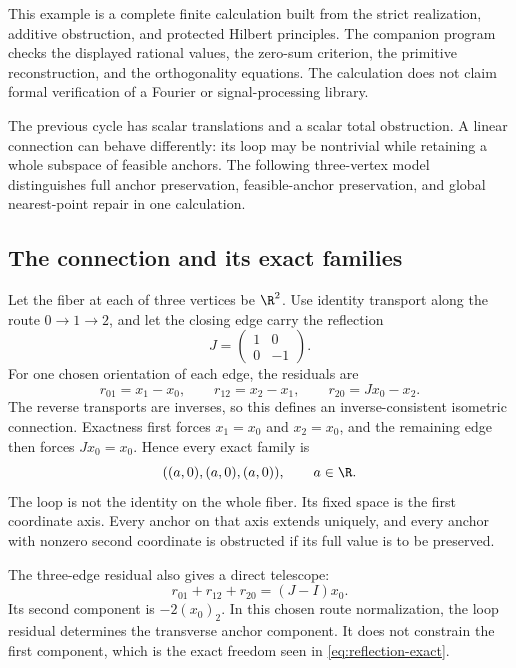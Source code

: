 This example is a complete finite calculation built from the strict realization, additive obstruction, and protected Hilbert principles. The companion program checks the displayed rational values, the zero-sum criterion, the primitive reconstruction, and the orthogonality equations. The calculation does not claim formal verification of a Fourier or signal-processing library.

\label{sec:twisted-loop}
The previous cycle has scalar translations and a scalar total obstruction. A linear connection can behave differently: its loop may be nontrivial while retaining a whole subspace of feasible anchors. The following three-vertex model distinguishes full anchor preservation, feasible-anchor preservation, and global nearest-point repair in one calculation.

\subsection{The connection and its exact families}
Let the fiber at each of three vertices be \(\R^2\). Use identity transport along the route \(0\to1\to2\), and let the closing edge carry the reflection
\[
 J=\begin{pmatrix}1&0\\0&-1\end{pmatrix}.
\]
For one chosen orientation of each edge, the residuals are
\[
 r_{01}=x_1-x_0,\qquad r_{12}=x_2-x_1,\qquad
 r_{20}=Jx_0-x_2.
\]
The reverse transports are inverses, so this defines an inverse-consistent isometric connection. Exactness first forces \(x_1=x_0\) and \(x_2=x_0\), and the remaining edge then forces \(Jx_0=x_0\). Hence every exact family is
\begin{equation}\label{eq:reflection-exact}
 ((a,0),(a,0),(a,0)),\qquad a\in\R.
\end{equation}
The loop is not the identity on the whole fiber. Its fixed space is the first coordinate axis. Every anchor on that axis extends uniquely, and every anchor with nonzero second coordinate is obstructed if its full value is to be preserved.

The three-edge residual also gives a direct telescope:
\[
 r_{01}+r_{12}+r_{20}=(J-I)x_0.
\]
Its second component is \(-2(x_0)_2\). In this chosen route normalization, the loop residual determines the transverse anchor component. It does not constrain the first component, which is the exact freedom seen in \eqref{eq:reflection-exact}.

